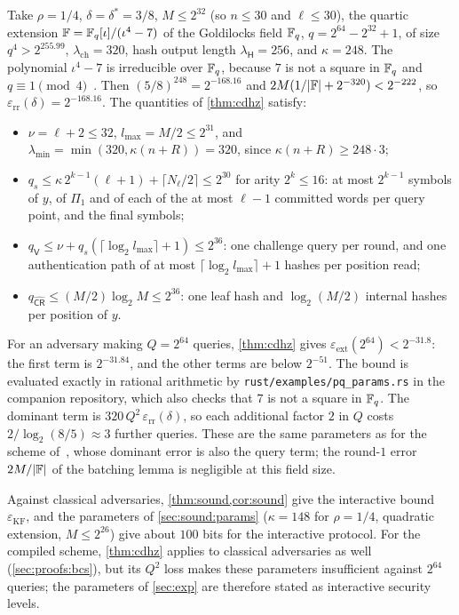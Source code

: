 \begin{remark}\label{rem:pq-params}
Take $\rho = 1/4$, $\delta = \delta^* = 3/8$, $M \le 2^{32}$ (so $n \le 30$ and $\ell \le 30$), the quartic extension $\mathbb{F} = \mathbb{F}_q[\iota]/(\iota^4 - 7)$ of the Goldilocks field $\mathbb{F}_q$, $q = 2^{64} - 2^{32} + 1$, of size $q^4 > 2^{255.99}$, $\lambda_{\mathrm{ch}} = 320$, hash output length $\lambda_{\mathsf{H}} = 256$, and $\kappa = 248$.
The polynomial $\iota^4 - 7$ is irreducible over $\mathbb{F}_q$, because $7$ is not a square in $\mathbb{F}_q$ and $q \equiv 1 \pmod 4$~\cite[Theorem~3.75]{LN97}.
Then $(5/8)^{248} = 2^{-168.16}$ and $2M(1/|\mathbb{F}| + 2^{-320}) < 2^{-222}$, so $\varepsilon_{\mathrm{rr}}(\delta) = 2^{-168.16}$.
The quantities of \cref{thm:cdhz} satisfy:
\begin{itemize}
  \item $\nu = \ell + 2 \le 32$, $l_{\max} = M/2 \le 2^{31}$, and $\lambda_{\min} = \min(320, \kappa(n+R)) = 320$, since $\kappa(n+R) \ge 248 \cdot 3$;
  \item $q_s \le \kappa\, 2^{k-1} (\ell + 1) + \lceil N_\ell/2 \rceil \le 2^{30}$ for arity $2^k \le 16$: at most $2^{k-1}$ symbols of $y$, of $\Pi_1$ and of each of the at most $\ell - 1$ committed words per query point, and the final symbols;
  \item $q_{\mathsf{V}} \le \nu + q_s(\lceil \log_2 l_{\max} \rceil + 1) \le 2^{36}$: one challenge query per round, and one authentication path of at most $\lceil \log_2 l_{\max} \rceil + 1$ hashes per position read;
  \item $q_{\widehat{\mathsf{CR}}} \le (M/2)\log_2 M \le 2^{36}$: one leaf hash and $\log_2(M/2)$ internal hashes per position of $y$.
\end{itemize}
For an adversary making $Q = 2^{64}$ queries, \cref{thm:cdhz} gives $\varepsilon_{\mathrm{ext}}(2^{64}) < 2^{-31.8}$: the first term is $2^{-31.84}$, and the other terms are below $2^{-51}$. The bound is evaluated exactly in rational arithmetic by \texttt{rust/examples/pq\_params.rs} in the companion repository, which also checks that $7$ is not a square in $\mathbb{F}_q$.
The dominant term is $320\,Q^2\,\varepsilon_{\mathrm{rr}}(\delta)$, so each additional factor $2$ in $Q$ costs $2/\log_2(8/5) \approx 3$ further queries.
These are the same parameters as for the scheme of~\cite{Mkh26}, whose dominant error is also the query term; the round-$1$ error $2M/|\mathbb{F}|$ of the batching lemma is negligible at this field size.
\end{remark}

\begin{remark}\label{rem:classical}
Against classical adversaries, \cref{thm:sound,cor:sound} give the interactive bound $\varepsilon_{\mathrm{KF}}$, and the parameters of \cref{sec:sound:params} ($\kappa = 148$ for $\rho = 1/4$, quadratic extension, $M \le 2^{26}$) give about $100$ bits for the interactive protocol.
For the compiled scheme, \cref{thm:cdhz} applies to classical adversaries as well (\cref{sec:proofs:bcs}), but its $Q^2$ loss makes these parameters insufficient against $2^{64}$ queries; the parameters of \cref{sec:exp} are therefore stated as interactive security levels.
\end{remark}

